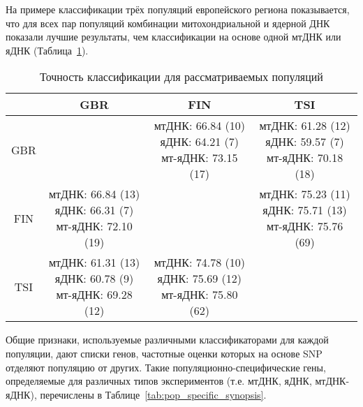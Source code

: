 На примере классификации трёх популяций европейского региона показывается, что для всех пар популяций комбинации митохондриальной и ядерной ДНК показали лучшие результаты, чем классификации на основе одной мтДНК или яДНК (Таблица~\ref{tab:accuracy_synopsis}). 

\begin{table} [htbp]
	\centering
	\begin{threeparttable}
		\caption{Точность классификации для рассматриваемых популяций}%
		\label{tab:accuracy_synopsis}%
		\begin{SingleSpace}
			\begin{tabular}{| c | c | c | c |}
				\hline
				& GBR & FIN & TSI \\ \hline
				GBR      & & \thead{мтДНК: 66.84 (10) \\ яДНК: 64.21 (7) \\ мт-яДНК: 73.15 (17)}&\thead{мтДНК: 61.28 (12) \\ яДНК: 59.57 (7) \\ мт-яДНК: 70.18 (18)}\\ \hline
				FIN      & \thead{мтДНК: 66.84 (13) \\ яДНК: 66.31 (7) \\ мт-яДНК: 72.10 (19)}& &\thead{мтДНК: 75.23 (11) \\ яДНК: 75.71 (13) \\ мт-яДНК: 75.76 (69)} \\ \hline
				TSI      & \thead{мтДНК: 61.31 (13) \\ яДНК: 60.78 (9) \\ мт-яДНК: 69.28 (12)}& \thead{мтДНК: 74.78 (10) \\ яДНК: 75.69 (12) \\ мт-яДНК: 75.80 (62)}& \\ \hline
			\end{tabular}%
		\end{SingleSpace}
	\end{threeparttable}
\end{table}

Общие признаки, используемые различными классификаторами для каждой популяции, дают списки генов, частотные оценки которых на основе SNP отделяют популяцию от других. Такие популяционно-специфические гены, определяемые для различных типов экспериментов (т.е. мтДНК, яДНК, мтДНК-яДНК), перечислены в Таблице~\ref{tab:pop_specific_synopsis}.

